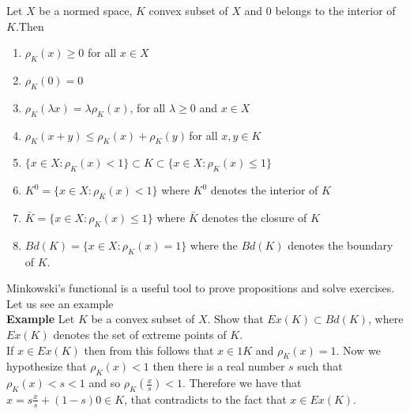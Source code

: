 \documentclass[12pt]{article}
\begin{document}
Let $X$ be a normed space, $K$ convex subset of $X$ and $0$ belongs to the interior of $K$.Then
\begin{enumerate} 
\item $\rho_{K}(x)\geq 0$ for all $x\in X$
\item $\rho_{K}(0)= 0$
\item $\rho_{K}(\lambda x)= \lambda \rho_{K}(x)$, for all $\lambda\geq 0$ and $x\in X$
\item $\rho_{K}(x+y)\leq \rho_{K}(x)+\rho_{K}(y)$\,for all $x,y \in K$ 
\item $\{x\in X\colon \rho_{K}(x)<1\}\subset K \subset \{x\in X\colon \rho_{K}(x)\leq 1\}$
\item $K^{0}=\{x\in X\colon \rho_{K}(x)<1\}$ where $K^{0}$ denotes the interior of $K$
\item $\bar K=\{x\in X\colon \rho_{K}(x)\leq 1\}$  where $\bar K$ denotes the closure of $K$
\item $Bd(K)= \{x\in X\colon \rho_{K}(x)= 1\}$ where the $Bd(K)$ denotes the boundary of $K$.
\end{enumerate}
Minkowski's functional is a useful tool to prove propositions and  solve  exercises. Let us see an example\\
\textbf{Example} Let $K$ be a convex subset of $X$. Show that $Ex(K)\subset Bd(K)$, where $Ex(K)$ denotes the 
set of extreme points of $K$.
\\If $x\in Ex(K)$ then from this follows that $x\in 1K$ and $\rho_{K}(x)= 1$.
Now we hypothesize that $\rho_{K}(x)<1$ then there is a real number $s$ such that $\rho_{K}(x)<s<1$ and 
so $\rho_{K}(\frac{x}{s})<1$. Therefore we have that $x=s\frac{x}{s}+(1-s)0 \in K$, that contradicts to the 
fact that $x\in Ex(K).$
\end{document}
